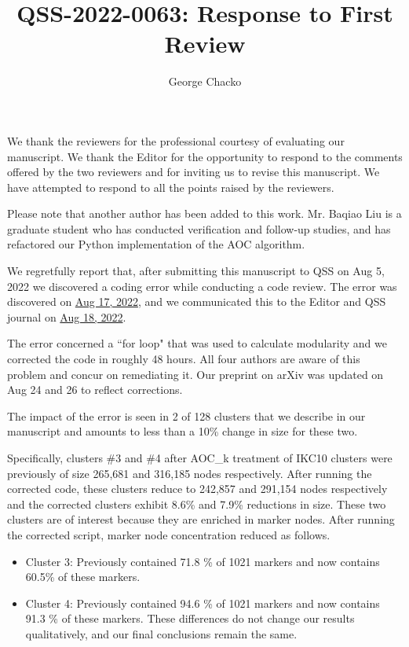 \documentclass[11pt, oneside]{article}   	%
\title{QSS-2022-0063: Response to First Review}
\author{George Chacko}
\begin{document}
\maketitle
\section*{}

We thank the reviewers for the professional courtesy of evaluating our manuscript. We thank the Editor for the opportunity to respond to the comments 
offered by the two reviewers and for inviting us to revise this manuscript. We have attempted to respond to all the points raised by the reviewers.

Please note that another author has been added to this work. Mr. Baqiao Liu is a graduate student who has conducted verification and follow-up studies, and 
has refactored our Python implementation of the AOC algorithm. 

We regretfully report that, after submitting this manuscript to QSS on Aug 5, 2022 we discovered a coding error while conducting a code review. The error was discovered 
on \underline{Aug 17, 2022},  and we communicated this to the Editor and QSS journal on \underline{Aug 18, 2022}. 

The error concerned a ``for loop" that was used to calculate modularity and we corrected the code in roughly 48 hours. All four authors are aware of this problem and 
concur on remediating it. Our preprint on arXiv was updated on Aug 24 and 26 to reflect corrections. 

The impact of the error is seen in 2 of 128 clusters  that we describe in our manuscript and amounts to less than a 10\% change in size for these two.
 
Specifically, clusters \#3 and \#4 after AOC\_k treatment of IKC10 clusters were previously of size 265,681 and 316,185 nodes respectively. After running the corrected code, these
clusters reduce to 242,857 and 291,154 nodes respectively and the corrected clusters exhibit 8.6\% and 7.9\% reductions in size. These two clusters are of interest because 
they are  enriched in marker nodes. After running the corrected script, marker node concentration reduced as follows. 

\begin{itemize}
\item Cluster 3: Previously contained 71.8 \% of 1021 markers and now contains 60.5\% of these markers.
\item Cluster 4: Previously contained 94.6 \% of 1021 markers and now contains 91.3 \% of these markers. These differences do not change our results qualitatively, and our final conclusions remain the same. 
\end{itemize}
\end{document}
